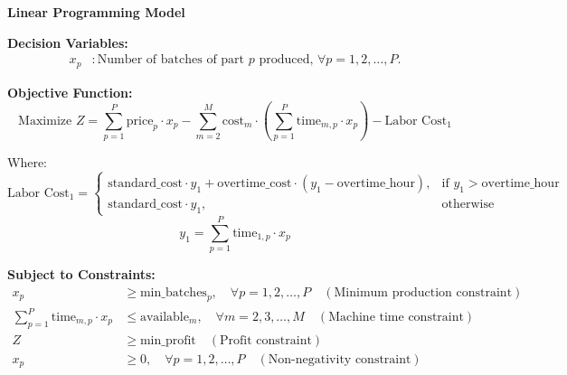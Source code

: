 \documentclass{article}
\begin{document}
\textbf{Linear Programming Model}

\textbf{Decision Variables:}
\begin{align*}
x_p & : \text{Number of batches of part } p \text{ produced, } \forall p = 1, 2, \ldots, P.
\end{align*}

\textbf{Objective Function:}
\[
\text{Maximize } Z = \sum_{p=1}^{P} \text{price}_p \cdot x_p - \sum_{m=2}^{M} \text{cost}_m \cdot \left( \sum_{p=1}^{P} \text{time}_{m,p} \cdot x_p \right) - \text{Labor Cost}_1
\]

Where:
\[
\text{Labor Cost}_1 = 
\begin{cases} 
\text{standard\_cost} \cdot y_1 + \text{overtime\_cost} \cdot (y_1 - \text{overtime\_hour}), & \text{if } y_1 > \text{overtime\_hour} \\
\text{standard\_cost} \cdot y_1, & \text{otherwise}
\end{cases}
\]
\[
y_1 = \sum_{p=1}^{P} \text{time}_{1,p} \cdot x_p
\]

\textbf{Subject to Constraints:}
\begin{align*}
x_p & \geq \text{min\_batches}_p, \quad \forall p = 1, 2, \ldots, P \quad (\text{Minimum production constraint}) \\
\sum_{p=1}^{P} \text{time}_{m,p} \cdot x_p & \leq \text{available}_m, \quad \forall m = 2, 3, \ldots, M \quad (\text{Machine time constraint}) \\
Z & \geq \text{min\_profit} \quad (\text{Profit constraint}) \\
x_p & \geq 0, \quad \forall p = 1, 2, \ldots, P \quad (\text{Non-negativity constraint})
\end{align*}
\end{document}
